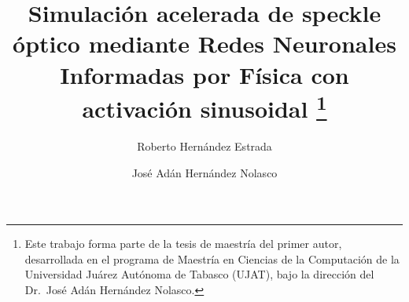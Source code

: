 \documentclass[runningheads]{llncs}
\begin{document}

\title{Simulaci\'{o}n acelerada de speckle \'{o}ptico mediante
       Redes Neuronales Informadas por F\'{i}sica con activaci\'{o}n
       sinusoidal%
       \thanks{Este trabajo forma parte de la tesis de maestr\'{i}a
               del primer autor, desarrollada en el programa de
               Maestr\'{i}a en Ciencias de la Computaci\'{o}n de la
               Universidad Ju\'{a}rez Aut\'{o}noma de Tabasco (UJAT),
               bajo la direcci\'{o}n del
               Dr.~Jos\'{e} Ad\'{a}n Hern\'{a}ndez Nolasco.}}


\author{Roberto Hern\'{a}ndez Estrada \and
        Jos\'{e} Ad\'{a}n Hern\'{a}ndez Nolasco}



\maketitle
\end{document}
